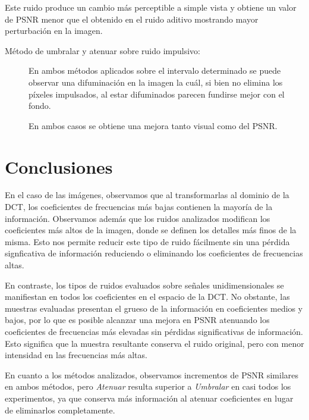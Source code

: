 \documentclass[a4paper,10pt,twoside]{article}
\begin{document}
Este ruido produce un cambio más perceptible a simple vista y obtiene un valor de PSNR menor que el obtenido en el ruido aditivo mostrando mayor perturbación en la imagen.
\begin{description}
\item[Método de umbralar y atenuar sobre ruido impulsivo:]
En ambos métodos aplicados sobre el intervalo determinado se puede observar una difuminación en la imagen la cuál, si bien no elimina los píxeles impulsados, al estar difuminados parecen fundirse mejor con el fondo.

En ambos casos se obtiene una mejora tanto visual como del PSNR.
\end{description}


\section{Conclusiones}

En el caso de las imágenes, observamos que al transformarlas al dominio de la DCT, los coeficientes de frecuencias más bajas contienen la mayoría de la información. Observamos además que los ruidos analizados modifican los coeficientes más altos de la imagen, donde se definen los detalles más finos de la misma. Esto nos permite reducir este tipo de ruido fácilmente sin una pérdida signficativa de información reduciendo o eliminando los coeficientes de frecuencias altas.

En contraste, los tipos de ruidos evaluados sobre señales unidimensionales se manifiestan en todos los coeficientes en el espacio de la DCT. No obstante, las muestras evaluadas presentan el grueso de la información en coeficientes medios y bajos, por lo que es posible alcanzar una mejora en PSNR atenuando los coeficientes de frecuencias más elevadas sin pérdidas significativas de información. Esto significa que la muestra resultante conserva el ruido original, pero con menor intensidad en las frecuencias más altas.

En cuanto a los métodos analizados, observamos incrementos de PSNR similares en ambos métodos, pero \textit{Atenuar} resulta superior a \textit{Umbralar} en casi todos los experimentos, ya que conserva más información al atenuar coeficientes en lugar de eliminarlos completamente. 
\end{document}
